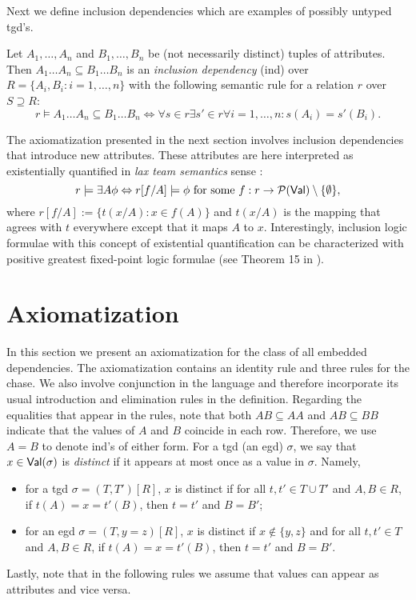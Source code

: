 \documentclass[envcountset]{llncs}
\newcommand{\problemFont}[1]{\protect\ensuremath{\mathsf{#1}}}
\newcommand{\si}{\sigma}
\newcommand{\sub}{\subseteq}
\newcommand{\Po}{\mathcal{P}}
\newcommand{\on}{\exists}
\newcommand{\Val}{\problemFont{Val}}
\begin{document}
Next we define inclusion dependencies which are examples of possibly untyped tgd's. 
\begin{definition}
Let $A_1, \ldots ,A_n$ and $B_1, \ldots ,B_n$ be (not necessarily distinct) tuples of attributes. Then $A_1 \ldots A_n \sub B_1 \ldots B_n$ is an \emph{inclusion dependency} (ind) over $R= \{A_i,B_i: i=1, \ldots ,n\}$ with the following semantic rule for a relation $r$ over $S\supseteq R$:
$$r\models A_1 \ldots A_n \sub B_1 \ldots B_n \Leftrightarrow \forall s\in r\exists s'\in r \forall i=1, \ldots ,n: s(A_i)=s'(B_i).$$
\end{definition}
The axiomatization presented in the next section involves inclusion dependencies that introduce new attributes. These attributes are here interpreted as existentially quantified in \emph{lax team semantics} sense \cite{galliani12}:
\begin{equation}\label{lax}
r\models \on A \phi \Leftrightarrow r[f/ A] \models \phi \textrm{ for some } f:r\to \Po(\Val)\setminus\{\emptyset\},
\end{equation}
where $r[f/ A]:=\{t(x/A) : x\in f(A)\}$ and $t(x/A)$ is the mapping that agrees with $t$ everywhere except that it maps $A$ to $x$. Interestingly, inclusion logic formulae with this concept of existential quantification can be characterized with positive greatest fixed-point logic formulae (see Theorem 15 in \cite{gallhella13}).











\section{Axiomatization}\label{axiomatization}
In this section we present an axiomatization for the class of all embedded dependencies. The axiomatization contains an identity rule and three rules for the chase. We also involve conjunction in the language and therefore incorporate its usual introduction and elimination rules in the definition.  
Regarding the equalities that appear in the rules, note that both $AB\sub AA$ and $AB \sub BB$  indicate that the values of $A$ and $B$ coincide in each row. Therefore, we use $A=B$ to denote ind's of either form. For a tgd (an egd) $\si$, we say that $x\in \Val(\si)$ is \emph{distinct} if it appears at most once as a value in $\si$. Namely, 
\begin{itemize}
\item for a tgd $\si=(T,T')[R]$, $x$ is distinct if for all $t,t'\in T\cup T'$ and $A,B\in R$, if $t(A)=x=t'(B)$, then $t=t'$ and $B=B'$;
\item for an egd $\si=(T,y=z)[R]$, $x$ is distinct if $x\not\in\{y,z\}$ and for all $t,t'\in T$ and $A,B\in R$, if $t(A)=x=t'(B)$, then $t=t'$ and $B=B'$.

\end{itemize}
Lastly, note that in the following  rules we  assume that values can appear as attributes and vice versa.
\end{document}
